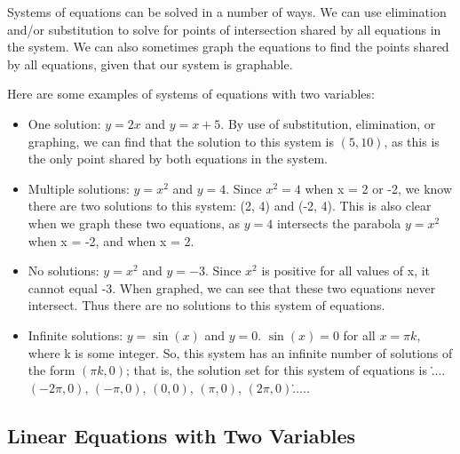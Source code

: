 Systems of equations can be solved in a number of ways. We can use elimination and/or
substitution to solve for points of intersection shared by all equations in the system. We
can also sometimes graph the equations to find the points shared by all equations, given
that our system is graphable.



Here are some examples of systems of equations with two variables:



\begin{itemize}
    \item One solution: $y = 2x$ and $y = x + 5$. By use of substitution, elimination, or graphing, we can find that the solution to this system is $(5, 10)$, as this is the only point shared by both equations in the system.
    \item Multiple solutions: $y = x^2$ and $y = 4$. Since $x^2 = 4$ when x = 2 or -2, we know there are two solutions to this system: (2, 4) and (-2, 4). This is also clear when we graph these two equations, as $y = 4$ intersects the parabola $y = x^2$ when x = -2, and when x = 2.
    \item No solutions: $y = x^2$ and $y = -3$. Since $x^2$ is positive for all values of x, it cannot equal -3. When graphed, we can see that these two equations never intersect. Thus there are no solutions to this system of equations.
    \item Infinite solutions: $y = \sin(x)$ and $y = 0$. $\sin(x) = 0$ for all $x = \pi k$, where k is some integer. So, this system has an infinite number of solutions of the form $(\pi k, 0)$; that is, the solution set for this system of equations is {\.....$(-2\pi, 0)$, $(-\pi, 0)$, $(0, 0)$, $(\pi, 0)$, $(2\pi, 0)$\.....}.
\end{itemize}


\subsection{Linear Equations with Two Variables}
\label{sss:line-f2a6}




